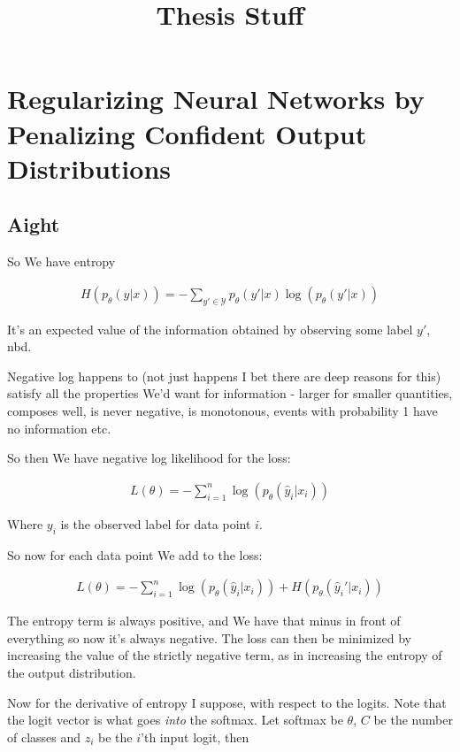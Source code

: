 \documentclass{article}
\begin{document}
\title{Thesis Stuff}
\author{}
\date{}

\maketitle

\section{Regularizing Neural Networks by Penalizing Confident Output Distributions}

	\subsection{Aight}
	
		So We have entropy
		
		\begin{align}
			H(p_\theta(y|x)) = -\sum_{y'\in\mathcal{Y}} p_\theta(y'|x)\log(p_\theta(y'|x))
		\end{align}
		
		It's an expected value of the information obtained by observing some label $y'$, nbd. 
		
		Negative log happens to (not just happens I bet there are deep reasons for this) satisfy all the properties We'd want for information - larger for smaller quantities, composes well, is never negative, is monotonous, events with probability 1 have no information etc.
		
		So then We have negative log likelihood for the loss:
		
		\begin{align}
			L(\theta) = -\sum^n_{i=1} \log(p_\theta(\hat{y}_i|x_i))
		\end{align}
		
		Where $y_i$ is the observed label for data point $i$.
		
		So now for each data point We add to the loss:
		
		\begin{align}
			L(\theta) = -\sum^n_{i=1} \log(p_\theta(\hat{y}_i|x_i)) + H(p_\theta(\hat{y}_i'|x_i))
		\end{align}
		
		The entropy term is always positive, and We have that minus in front of everything so now it's always negative. The loss can then be minimized by increasing the value of the strictly negative term, as in increasing the entropy of the output distribution.
		
		Now for the derivative of entropy I suppose, with respect to the logits. Note that the logit vector is what goes \textit{into} the softmax. Let softmax be $\theta$, $C$ be the number of classes and $z_i$ be the $i$'th input logit, then
		
\end{document}
